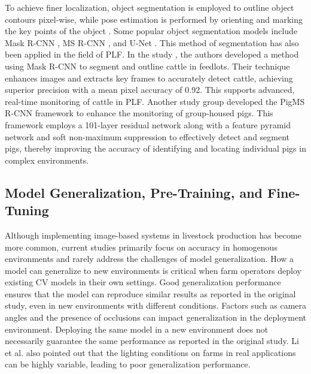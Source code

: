 To achieve finer localization, object segmentation is employed to outline object contours pixel-wise, while pose estimation is performed by orienting and marking the key points of the object \cite{hariharan2015hypercolumns}. Some popular object segmentation models include Mask R-CNN \cite{he2017mask}, MS R-CNN \cite{huang2019mask}, and U-Net \cite{siddique2021u}. This method of segmentation has also been applied in the field of PLF. In the study \cite{noe2022automatic}, the authors developed a method using Mask R-CNN \cite{he2017mask} to segment and outline cattle in feedlots. Their technique enhances images and extracts key frames to accurately detect cattle, achieving superior precision with a mean pixel accuracy of 0.92. This supports advanced, real-time monitoring of cattle in PLF. Another study group \cite{tu2021automatic} developed the PigMS R-CNN framework \cite{huang2019mask} to enhance the monitoring of group-housed pigs. This framework employs a 101-layer residual network along with a feature pyramid network and soft non-maximum suppression to effectively detect and segment pigs, thereby improving the accuracy of identifying and locating individual pigs in complex environments.

\subsection*{Model Generalization, Pre-Training, and Fine-Tuning}

Although implementing image-based systems in livestock production has become more common, current studies primarily focus on accuracy in homogenous environments and rarely address the challenges of model generalization. How a model can generalize to new environments is critical when farm operators deploy existing CV models in their own settings. Good generalization performance ensures that the model can reproduce similar results as reported in the original study, even in new environments with different conditions. Factors such as camera angles and the presence of occlusions can impact generalization in the deployment environment. Deploying the same model in a new environment does not necessarily guarantee the same performance as reported in the original study. Li et al. \cite{li2021practices} also pointed out that the lighting conditions on farms in real applications can be highly variable, leading to poor generalization performance.

